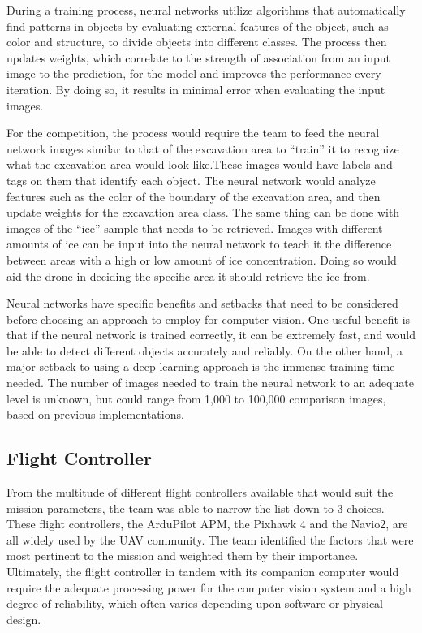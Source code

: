 		During a training process, neural networks utilize algorithms that automatically find patterns in objects by evaluating external features of the object, such as color and structure, to divide objects into different classes. The process then updates weights, which correlate to the strength of association from an input image to the prediction, for the model and improves the performance every iteration. By doing so, it results in minimal error when evaluating the input images.
		
		For the competition, the process would require the team to feed the neural network images similar to that of the excavation area to “train” it to recognize what the excavation area would look like.These images would have labels and tags on them that identify each object. The neural network would analyze features such as the color of the boundary of the excavation area, and then update weights for the excavation area class. The same thing can be done with images of the “ice” sample that needs to be retrieved. Images with different amounts of ice can be input into the neural network to teach it the difference between areas with a high or low amount of ice concentration. Doing so would aid the drone in deciding the specific area it should retrieve the ice from.
		
		Neural networks have specific benefits and setbacks that need to be considered before choosing an approach to employ for computer vision. One useful benefit is that if the neural network is trained correctly, it can be extremely fast, and would be able to detect different objects accurately and reliably. On the other hand, a major setback to using a deep learning approach is the immense training time needed. The number of images needed to train the neural network to an adequate level is unknown, but could range from 1,000 to 100,000 comparison images, based on previous implementations.

	\subsection{Flight Controller}
		From the multitude of different flight controllers available that would suit the mission parameters, the team was able to narrow the list down to 3 choices. These flight controllers, the ArduPilot APM, the Pixhawk 4 and the Navio2, are all widely used by the UAV community. The team identified the factors that were most pertinent to the mission and weighted them by their importance. Ultimately, the flight controller in tandem with its companion computer would require the adequate processing power for the computer vision system and a high degree of reliability, which often varies depending upon software or physical design.

